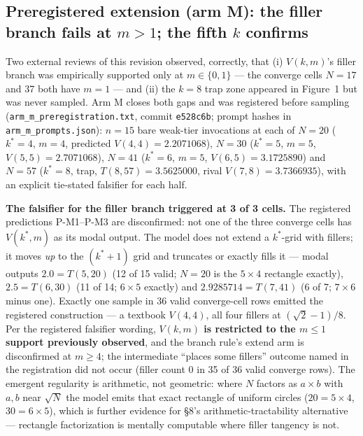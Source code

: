 \documentclass[11pt]{article}
\begin{document}
\subsection{Preregistered extension (arm M): the filler branch fails at $m > 1$; the fifth $k$ confirms}

Two external reviews of this revision observed, correctly, that (i) $V(k, m)$'s filler branch
was empirically supported only at $m \in \{0, 1\}$ --- the converge cells $N = 17$ and 37 both have
$m = 1$ --- and (ii) the $k = 8$ trap zone appeared in Figure~1 but was never sampled. Arm M closes
both gaps and was registered before sampling (\texttt{arm\_m\_preregistration.txt}, commit \texttt{e528c6b};
prompt hashes in \texttt{arm\_m\_prompts.json}): $n = 15$ bare weak-tier invocations at each of $N = 20$
($k^{*} = 4$, $m = 4$, predicted $V(4,4) = 2.2071068$), $N = 30$ ($k^{*} = 5$, $m = 5$, $V(5,5) = 2.7071068$),
$N = 41$ ($k^{*} = 6$, $m = 5$, $V(6,5) = 3.1725890$) and $N = 57$ ($k^{*} = 8$, trap, $T(8,57) = 3.5625000$,
rival $V(7,8) = 3.7366935$), with an explicit tie-stated falsifier for each half.

\textbf{The falsifier for the filler branch triggered at 3 of 3 cells.} The registered predictions
P-M1--P-M3 are disconfirmed: not one of the three converge cells has $V(k^{*}, m)$ as its modal
output. The model does not extend a $k^{*}$-grid with fillers; it moves \textit{up} to the $(k^{*}+1)$ grid
and truncates or exactly fills it --- modal outputs $2.0 = T(5,20)$ (12 of 15 valid; $N = 20$ is the
$5\times4$ rectangle exactly), $2.5 = T(6,30)$ (11 of 14; $6\times5$ exactly) and $2.9285714 = T(7,41)$
(6 of 7; $7\times6$ minus one). Exactly one sample in 36 valid converge-cell rows emitted the
registered construction --- a textbook $V(4,4)$, all four fillers at $(\sqrt{2}-1)/8$. Per the
registered falsifier wording, \textbf{$V(k, m)$ is restricted to the $m \le 1$ support previously
observed}, and the branch rule's extend arm is disconfirmed at $m \ge 4$; the intermediate
``places some fillers'' outcome named in the registration did not occur (filler count 0 in 35
of 36 valid converge rows). The emergent regularity is arithmetic, not geometric: where $N$
factors as $a\times b$ with $a, b$ near $\sqrt{N}$ the model emits that exact rectangle of uniform circles
($20 = 5\times4$, $30 = 6\times5$), which is further evidence for \S8's arithmetic-tractability alternative
--- rectangle factorization is mentally computable where filler tangency is not.
\end{document}
